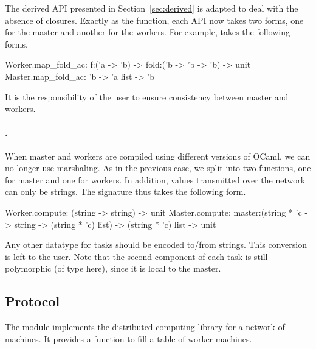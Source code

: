 \documentclass{llncs}
\newcommand{\Ocaml}{OCaml}
\begin{document}
  The derived API presented in Section~\ref{sec:derived} is adapted to
  deal with the absence of closures. Exactly as the 
  function, each API now takes two forms, one for the master and
  another for the workers. For example,  takes the
  following forms.
  \begin{ocaml}
  Worker.map_fold_ac: f:('a -> 'b) -> fold:('b -> 'b -> 'b) -> unit 
  Master.map_fold_ac: 'b -> 'a list -> 'b
  \end{ocaml}
  It is the responsibility of the user to ensure consistency
  between master and workers.

  \paragraph{.} When master and workers are compiled using
  different versions of \Ocaml, we can no longer use marshaling.  As
  in the previous case, we split  into two functions, one
  for master and one for workers. In addition, values transmitted over
  the network can only be strings. The signature thus takes the
  following form.
  \begin{ocaml}
  Worker.compute: (string -> string) -> unit 
  Master.compute: master:(string * 'c -> string -> (string * 'c) list) -> 
    (string * 'c) list -> unit
  \end{ocaml}
  Any other datatype for tasks should be encoded to/from strings. This
  conversion is left to the user.  Note that the second component of
  each task is still polymorphic (of type  here), since it is
  local to the master.


\subsection{Protocol}\label{sec:protocol}

The  module implements the distributed computing library
for a network of machines. 
It provides a function
 to fill a table of
worker machines. 
\end{document}
